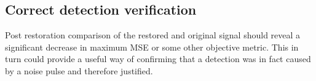 \subsection{Correct detection verification}
Post restoration comparison of the restored and original signal should reveal a significant decrease in maximum MSE or some other objective metric. This in turn could provide a useful way of confirming that a detection was in fact caused by a noise pulse and therefore justified.

















%




